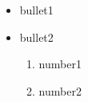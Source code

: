 \documentclass[10pt,a4paper]{article}
\begin{document}
\begin{itemize}
\item bullet1
\item bullet2
\begin{enumerate}
\item number1
\item number2
\end{enumerate}
\end{itemize}
\end{document}
